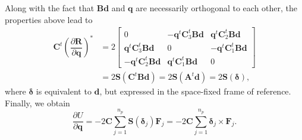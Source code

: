 \documentclass[aip,jcp,reprint,amsmath,amssymb,raggedbottom]{revtex4-1}
\newcommand{\mt}[1]{\boldsymbol{\mathbf{#1}}}           %
\newcommand{\vt}[1]{\boldsymbol{\mathbf{#1}}}           %
\newcommand{\tr}[1]{#1^t}                               %
\newcommand{\diff}[2]{\dfrac{\partial #1}{\partial #2}} %
\begin{document}
Along with the fact that $\mt B\vt d$ and $\vt q$ are necessarily orthogonal to each other, the properties above lead to
\begin{align*}
\tr{\mt C} \left( \diff{\vt R}{\vt q} \right)^\ast &= 2 \left[\begin{array}{ccc}
0 & -\tr{\vt q}\tr{\mt C}_3 \mt B \vt d & \tr{\vt q}\tr{\mt C}_2 \mt B \vt d \\
\tr{\vt q}\tr{\mt C}_3 \mt B \vt d & 0 & -\tr{\vt q}\tr{\mt C}_1 \mt B \vt d \\
-\tr{\vt q}\tr{\mt C}_2 \mt B \vt d & \tr{\vt q}\tr{\mt C}_1 \mt B \vt d & 0
\end{array}\right] \\
&= 2 \mt S(\tr{\mt C} \mt B \vt d) = 2 \mt S(\tr{\mt A}\vt d) = 2 \mt S(\vt \delta),
\end{align*}
where $\vt \delta$ is equivalent to $\vt d$, but expressed in the space-fixed frame of reference. Finally, we obtain
\[
\diff{U}{\vt q} = - 2 \mt C \sum_{j=1}^{n_p} \mt S(\vt \delta_j) {\vt F_j}  = - 2 \mt C \sum_{j=1}^{n_p} \vt \delta_j \times {\vt F_j}.
\]



\end{document}
